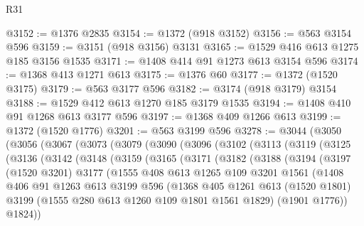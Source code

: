 \begin{lexlean}{R31}
\begin{coremodule}
@3152 := @1376 @2835
@3154 := @1372 (@918 @3152)
@3156 := @563 @3154 @596
@3159 := @3151 (@918 @3156) @3131
@3165 := @1529 @416 @613 @1275 @185 @3156 @1535
@3171 := @1408 @414 @91 @1273 @613 @3154 @596
@3174 := @1368 @413 @1271 @613
@3175 := @1376 @60
@3177 := @1372 (@1520 @3175)
@3179 := @563 @3177 @596
@3182 := @3174 (@918 @3179) @3154
@3188 := @1529 @412 @613 @1270 @185 @3179 @1535
@3194 := @1408 @410 @91 @1268 @613 @3177 @596
@3197 := @1368 @409 @1266 @613
@3199 := @1372 (@1520 @1776)
@3201 := @563 @3199 @596
@3278 := @3044
    (@3050
      (@3056
        (@3067
          (@3073
            (@3079
              (@3090
                (@3096
                  (@3102
                    (@3113
                      (@3119
                        (@3125
                          (@3136
                            (@3142
                              (@3148
                                (@3159
                                  (@3165
                                    (@3171
                                      (@3182
                                        (@3188
                                          (@3194
                                            (@3197
                                              (@1520 @3201)
                                              @3177
                                              (@1555
                                                @408
                                                @613
                                                @1265
                                                @109
                                                @3201
                                                @1561
                                                (@1408
                                                  @406
                                                  @91
                                                  @1263
                                                  @613
                                                  @3199
                                                  @596
                                                  (@1368
                                                    @405
                                                    @1261
                                                    @613
                                                    (@1520 @1801)
                                                    @3199
                                                    (@1555 @280 @613 @1260 @109 @1801 @1561 @1829)
                                                    (@1901 @1776))
                                                  @1824))

\end{coremodule}
\end{lexlean}
